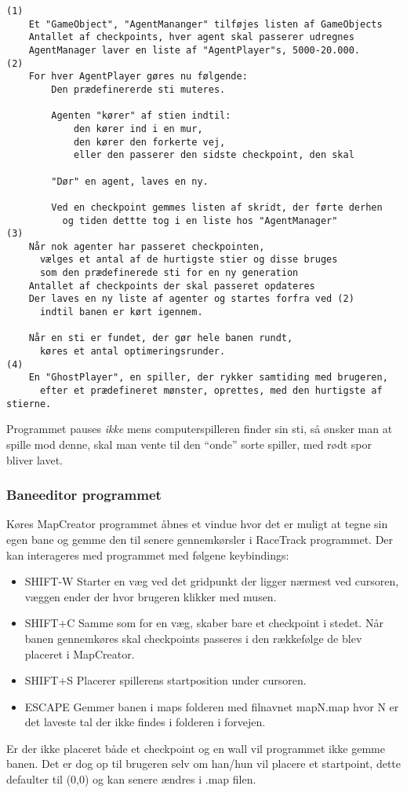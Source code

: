 \begin{lstlisting}
(1)
	Et "GameObject", "AgentMananger" tilføjes listen af GameObjects
	Antallet af checkpoints, hver agent skal passerer udregnes
	AgentManager laver en liste af "AgentPlayer"s, 5000-20.000.
(2)
	For hver AgentPlayer gøres nu følgende:
		Den prædefinererde sti muteres.
		
		Agenten "kører" af stien indtil:
			den kører ind i en mur,
			den kører den forkerte vej,
			eller den passerer den sidste checkpoint, den skal
		
		"Dør" en agent, laves en ny.
		
		Ved en checkpoint gemmes listen af skridt, der førte derhen
		  og tiden dettte tog i en liste hos "AgentManager"
(3)
	Når nok agenter har passeret checkpointen,
	  vælges et antal af de hurtigste stier og disse bruges
	  som den prædefinerede sti for en ny generation
	Antallet af checkpoints der skal passeret opdateres
	Der laves en ny liste af agenter og startes forfra ved (2)
	  indtil banen er kørt igennem.

	Når en sti er fundet, der gør hele banen rundt,
	  køres et antal optimeringsrunder.
(4)
	En "GhostPlayer", en spiller, der rykker samtiding med brugeren,
	  efter et prædefineret mønster, oprettes, med den hurtigste af stierne.
\end{lstlisting}

Programmet pauses \emph{ikke} mens computerspilleren finder sin sti, så ønsker man at spille mod denne,
skal man vente til den ``onde'' sorte spiller, med rødt spor bliver lavet. 


\subsubsection{Baneeditor programmet}
Køres MapCreator programmet åbnes et vindue hvor det er muligt at tegne sin egen bane og gemme den til senere gennemkørsler i RaceTrack programmet.
Der kan interageres med programmet med følgene keybindings:
\begin{itemize}
  \item SHIFT-W Starter en væg ved det gridpunkt der ligger nærmest ved cursoren, væggen ender der hvor brugeren klikker med musen.
  \item SHIFT+C Samme som for en væg, skaber bare et checkpoint i stedet. Når banen gennemkøres skal checkpoints passeres i den rækkefølge de blev placeret i MapCreator.
  \item SHIFT+S Placerer spillerens startposition under cursoren.
  \item ESCAPE Gemmer banen i maps folderen med filnavnet mapN.map hvor N er det laveste tal der ikke findes i folderen i forvejen.
\end{itemize}
Er der ikke placeret både et checkpoint og en wall vil programmet ikke gemme banen. Det er dog op til brugeren selv om han/hun vil placere et startpoint, dette defaulter til (0,0) og kan senere ændres i .map filen.

